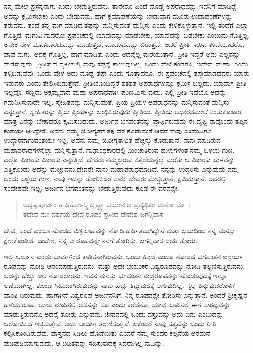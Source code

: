 ನನ್ನ ಮೇಲೆ ಪ್ರಸನ್ನನಾಗು ಎಂದು ಬೇಡುತ್ತಿರುವನು. ತಾನೇನೊ ಹಿಂದೆ ದೊಡ್ಡ ಅಪರಾಧವನ್ನು ಇವನಿಗೆ ಮಾಡಿದ್ದೆ; ಅದನ್ನು ಕ್ಷಮಿಸಬೇಕು ಎಂದು ಬೇಡುವನು. ಹಾಗೆ ಕ್ಷಮಾಪಣೆಯನ್ನು ಬೇಡುವಾಗ ಮೂರು ಉದಾಹರಣೆಗಳನ್ನು ತರುವನು. ತಂದೆ ತನ್ನ ಮಗ ಮಾಡಿದ ತಪ್ಪನ್ನು ಮನ್ನಿಸುವಂತೆ ಮನ್ನಿಸು ಎಂದು ಕೇಳಿಕೊಳ್ಳುತ್ತಾನೆ. ಇಲ್ಲಿ ತಂದೆಗೆ ಎಲ್ಲಾ ಗೊತ್ತಿದೆ. ಮಗುವಿ ಗಾದರೋ ಪ್ರಪಂಚದಲ್ಲಿ ಯಾವುದನ್ನು ಮಾಡಬೇಕು, ಯಾವುದನ್ನು ಬಿಡಬೇಕು ಎಂಬುದು ಗೊತ್ತಿಲ್ಲ. ಅನೇಕ ವೇಳೆ ಮಾಡಬಾರದುದನ್ನು ಮಾಡುತ್ತದೆ, ಮಾಡುವುದನ್ನು ಬಿಡುತ್ತದೆ. ಆದರೆ ಪ್ರೀತಿ ಇರುವ ತಂದೆಯಾದರೊ, ಪಾಪ ಮಗು, ಅದಕ್ಕೆ ಗೊತ್ತಿಲ್ಲ, ಹಾಗೆ ಮಾಡಿತು ಎಂದು ಅದನ್ನೆಲ್ಲ ಮರೆಯುತ್ತಾನೆ. ಪ್ರೀತಿ ಇದ್ದರೆ ಅದು ಎಲ್ಲವನ್ನು ಮರೆಸುವುದು. ಪ್ರೀತಿಸುವ ವ್ಯಕ್ತಿಯಲ್ಲಿ ನಾವು ತಪ್ಪನ್ನೆ ಕಾಣುವುದಿಲ್ಲ. ಒಂದು ವೇಳೆ ಕಂಡರೂ, ಇದೇನು ಮಹಾ, ಎಂದು ತಳ್ಳಿಬಿಡುವೆವು. ಒಂದು ವೇಳೆ ಅದು ದೊಡ್ಡ ತಪ್ಪೇ ಎಂದು ಗೊತ್ತಾದರೂ, ಈ ಪ್ರಪಂಚದಲ್ಲಿ ತಪ್ಪುಮಾಡದವರು ಯಾರು ಇರುವರು ಎಂದು ತೇಲಿಸಿಬಿಡುತ್ತೇವೆ. ಪ್ರೀತಿಯೊಂದಿದ್ದರೆ ಶತಶತ ಅಪರಾಧಗಳನ್ನೂ ಕ್ಷಮಿಸ ಬಲ್ಲದು. ಯಾವಾಗ ಪ್ರೀತಿ ಇಲ್ಲವೊ, ಸಣ್ಣದು ಅಕ್ಷಮ್ಯವಾದ ಮಹಾ ಅಪರಾಧವಾಗಿ ಪರಿಣಮಿಸು ವುದು. ಎಲ್ಲಿ ಪ್ರೀತಿ ಇದೆಯೊ ಅದನ್ನು ಗಮನಿಸಿಸುವುದೇ ಇಲ್ಲ. ಸ್ನೇಹಿತನನ್ನು ಮನ್ನಿಸುವಂತೆ, ಪ್ರಿಯ ಪ್ರಿಯಳ ಅಪರಾಧವನ್ನು ಮನ್ನಿಸುವಂತೆ ಮನ್ನಿಸು ಎನ್ನುತ್ತಾನೆ. ಸ್ನೇಹಿತರನ್ನು ಪ್ರಿಯ ಪ್ರಿಯಳನ್ನು ಬಂಧಿಸಿರುವುದು ಪ್ರೀತಿಯೆ. ಪ್ರೀತಿಯ ಆಧಾರದಮೇಲೆ ನಿಂತುಕೊಂಡರೆ ಮಾತ್ರ ಏನನ್ನು ಬೇಕಾದರೂ ಕ್ಷಮಿಸಬಹುದು. ಅರ್ಜುನ ಭಗವಂತನನ್ನು ಪ್ರಾರ್ಥಿಸುವುದು ಈ ದೃಷ್ಟಿ ನಾವೊಂದು ತಪ್ಪಿನ ಕಂತೆಯೇ ಆಗಿದ್ದೇವೆ. ಅವನು ನಮ್ಮ ಯೋಗ್ಯತೆಗೆ ತಕ್ಕ ವರ ಕೊಡುವಂತೆ ಆದರೆ ನಾವು ಎಂದೆಂದಿಗೂ ಉದ್ಧಾರವಾಗುವಂತೆಯೇ ಇಲ್ಲ. ಅವನು ನಮ್ಮ ಯೋಗ್ಯತೆಗಿಂತ ಹೆಚ್ಚನ್ನು ಕೊಡುತ್ತಾನೆ. ನಾವು ಮಾಡಿರುವ ಮಹಾಪರಾಧಗಳನ್ನೆಲ್ಲಾ ಮನ್ನಿಸುತ್ತಾನೆ. ಗಾಢಾಂಧಕಾರದಲ್ಲಿ ಮಿಂಚುತ್ತಿರುವ ಹುಳುಗಳಂತೆ ನಮ್ಮ ಒಳ್ಳೆಯ ಗುಣ. ಎಲ್ಲೊ ಮಿಣುಕು ಮಿಣುಕು ಎನ್ನುತ್ತಿದೆ. ದೇವರು ನಮ್ಮಲ್ಲಿರುವ ಕತ್ತಲೆಯನ್ನೆಲ್ಲ ಮರೆತು ಆ ಮಿಣುಕು ಹುಳವನ್ನು ಎತ್ತಿಕೊಂಡು ಅದನ್ನು ಮೆಚ್ಚುವನು.ದೇವರೇ ನಾನು ಮಹಾಪರಾಧಮಾಡಿದೆ, ನನ್ನನ್ನು ಉದ್ಧರಿಸು ಎನ್ನುವುದು ನಮ್ಮ ಒಂದು ಒಳ್ಳೆಯ ಗುಣ. ನಾವು ಇದನ್ನು ತೋರಿಸಿದರೆ ಸಾಕು, ದೇವರು ಮೆಚ್ಚುತ್ತಾನೆ, ಕ್ಷಮಿಸುತ್ತಾನೆ. ಅದರಲ್ಲಿ ಸಂದೇಹವೇ ಇಲ್ಲ. ಅರ್ಜುನ ಭಗವಂತನನ್ನು ಬೇಡುತ್ತಿರುವುದು ಕೂಡ ಈ ವರವನ್ನೇ.

\begin{verse}
ಅದೃಷ್ಟಪೂರ್ವಂ ಹೃಷಿತೋಽಸ್ಮಿ ದೃಷ್ಟ್ವಾ ಭಯೇನ ಚ ಪ್ರವ್ಯಥಿತಂ ಮನೋ ಮೇ ।\\ತದೇವ ಮೇ ದರ್ಶಯ ದೇವ ರೂಪಂ ಪ್ರಸೀದ ದೇವೇಶ ಜಗನ್ನಿವಾಸ 
\end{verse}

ದೇವ, ಹಿಂದೆ ಎಂದೂ ನೋಡದ ವಿಶ್ವರೂಪವನ್ನು ನೋಡಿ ಹರ್ಷಿತವಾಗಿದ್ದೇನೆ ಮತ್ತು ಭಯದಿಂದ ನನ್ನ ಮನಸ್ಸು ಕ್ಲೇಶಕೊಂಡಿದೆ. ದೇವೇಶ, ನಿನ್ನ ಆ ರೂಪವನ್ನೇ ನನಗೆ ತೋರಿಸು. ಜಗನ್ನಿವಾಸ ದಯೆ ತೋರು.

ಇಲ್ಲಿ ಅರ್ಜುನ ಎರಡು ಭಾವಗಳಿಂದ ತಾಡಿತನಾಗಿರುವನು. ಒಂದು ಹಿಂದೆ ಎಂದೂ ನೋಡದ ಭಗವಂತನ ಐಶ್ವರ್ಯ ರೂಪವನ್ನು ನೋಡಿ ಆನಂದಪಡುತ್ತಿರುವನು. ಮತ್ತು ಅದೇ ಭಯಂಕರ ವಿಶ್ವರೂಪವನ್ನು ನೋಡಿ ತಲ್ಲಣಿಸುತ್ತಿರುವನು. ಅದನ್ನು ಹೆಚ್ಚು ಕಾಲ ನೋಡಲಾರನು. ಇವನ ಮನಸ್ಸು ಭಗವಂತನ ರುದ್ರರೂಪವನ್ನು ನೋಡುವುದಕ್ಕೆ ಇನ್ನೂ ಅಣಿಯಾಗಿಲ್ಲ. ತುಂಬಾ ಸಿಹಿಯಾಗಿರುವುದನ್ನು ನಾವು ಹೆಚ್ಚು ತಿನ್ನುವುದಕ್ಕೆ ಆಗುವುದಿಲ್ಲ. ಸ್ವಲ್ಪ ತಿನ್ನುವುದರೊಳಗೆ ವಾಂತಿ ಬರುವುದು. ಹಾಗಾಗಿದೆ ವಿಶ್ವರೂಪ ಅರ್ಜುನನಿಗೆ. ನಿನ್ನ ರೂಪವನ್ನೇ ತೋರಿಸು ಎನ್ನುತ್ತಾನೆ. ಅಂದರೆ ಶ್ರೀಕೃಷ್ಣನ ಹಳೆಯ ರೂಪ. ಯಾವ ರೂಪಿನಲ್ಲಿ ಅವನನ್ನು ಸಖ ಎಂದು ಕರೆದನೊ, ಯಾವ ರೂಪಿನಲ್ಲಿ ಈಗ ಸಾರಥ್ಯವನ್ನು ಮಾಡುತ್ತಿರುವನೊ ಅದನ್ನೆ ತೋರು ಎನ್ನುವನು. ಜೀವನದಲ್ಲಿ ಒಂದು ವಸ್ತುವನ್ನು ಅದು ಏನು ಎಂಬುದನ್ನು ಆಲೋಚಿಸದೆ ಇಚ್ಛಿಸುತ್ತೇವ. ಅದು ಬಂದಾಗ ತಲ್ಲಣಿಸುತ್ತೇವೆ. ಏಕೆಂದರೆ ನಾವು ಸತ್ಯವನ್ನು ಒಂದು ರೀತಿ ಕಲ್ಪಿಸಿಕೊಂಡಿರುವೆವು. ವಾಸ್ತವದ ಸಿಡಿಲು ಹೊಡೆಯಿತು ಎಂದರೆ ನಮ್ಮ ಸುಂದರ ಕಲ್ಪನೆಯ ಅರಮನೆ ಪುಡಿಪುಡಿಯಾಗುವುದು. ಆ ಬಡಿತವನ್ನು ಸಹಿಸುವುದಕ್ಕೆ ಸಿದ್ಧರಾಗಿಲ್ಲ ನಾವಿನ್ನು.

